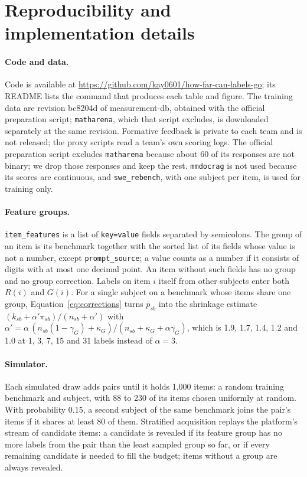 \documentclass{article}
\newcommand{\bench}[1]{\texttt{#1}}
\begin{document}
\section{Reproducibility and implementation details}
\label{app:repro}

\paragraph{Code and data.} Code is available at \url{https://github.com/kay0601/how-far-can-labels-go}; its README lists the command that produces each table and figure. The training data are revision bc8204d of measurement-db, obtained with the official preparation script; \bench{matharena}, which that script excludes, is downloaded separately at the same revision. Formative feedback is private to each team and is not released; the proxy scripts read a team's own scoring logs. The official preparation script excludes \bench{matharena} because about 60 of its responses are not binary; we drop those responses and keep the rest. \bench{mmdocrag} is not used because its scores are continuous, and \bench{swe\_rebench}, with one subject per item, is used for training only.

\paragraph{Feature groups.} \texttt{item\_features} is a list of \texttt{key=value} fields separated by semicolons. The group of an item is its benchmark together with the sorted list of its fields whose value is not a number, except \texttt{prompt\_source}; a value counts as a number if it consists of digits with at most one decimal point. An item without such fields has no group and no group correction. Labels on item $i$ itself from other subjects enter both $R(i)$ and $G(i)$. For a single subject on a benchmark whose items share one group, Equation~\eqref{eq:corrections} turns $\bar p_{sb}$ into the shrinkage estimate $(k_{sb} + \alpha' \pi_{sb})/(n_{sb} + \alpha')$ with $\alpha' = \alpha\, (n_{sb}(1 - \gamma_G) + \kappa_G)/(n_{sb} + \kappa_G + \alpha \gamma_G)$, which is 1.9, 1.7, 1.4, 1.2 and 1.0 at 1, 3, 7, 15 and 31 labels instead of $\alpha = 3$.

\paragraph{Simulator.} Each simulated draw adds pairs until it holds 1,000 items: a random training benchmark and subject, with 88 to 230 of its items chosen uniformly at random. With probability 0.15, a second subject of the same benchmark joins the pair's items if it shares at least 80 of them. Stratified acquisition replays the platform's stream of candidate items: a candidate is revealed if its feature group has no more labels from the pair than the least sampled group so far, or if every remaining candidate is needed to fill the budget; items without a group are always revealed.
\end{document}
